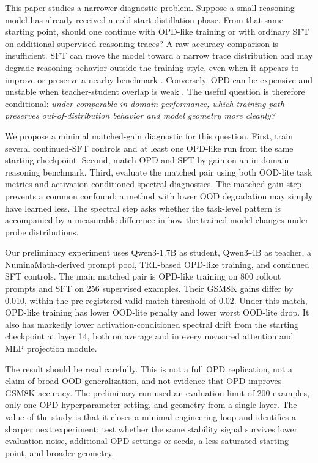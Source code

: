 \documentclass[letterpaper]{article}
\begin{document}
This paper studies a narrower diagnostic problem.
Suppose a small reasoning model has already received a cold-start distillation phase.
From that same starting point, should one continue with OPD-like training or with ordinary SFT on additional supervised reasoning traces?
A raw accuracy comparison is insufficient.
SFT can move the model toward a narrow trace distribution and may degrade reasoning behavior outside the training style, even when it appears to improve or preserve a nearby benchmark \citep{lobo2025finetuningcot}.
Conversely, OPD can be expensive and unstable when teacher-student overlap is weak \citep{li2026rethinkingopd}.
The useful question is therefore conditional: \emph{under comparable in-domain performance, which training path preserves out-of-distribution behavior and model geometry more cleanly?}

We propose a minimal matched-gain diagnostic for this question.
First, train several continued-SFT controls and at least one OPD-like run from the same starting checkpoint.
Second, match OPD and SFT by gain on an in-domain reasoning benchmark.
Third, evaluate the matched pair using both OOD-lite task metrics and activation-conditioned spectral diagnostics.
The matched-gain step prevents a common confound: a method with lower OOD degradation may simply have learned less.
The spectral step asks whether the task-level pattern is accompanied by a measurable difference in how the trained model changes under probe distributions.

Our preliminary experiment uses Qwen3-1.7B as student, Qwen3-4B as teacher, a NuminaMath-derived prompt pool, TRL-based OPD-like training, and continued SFT controls.
The main matched pair is OPD-like training on 800 rollout prompts and SFT on 256 supervised examples.
Their GSM8K gains differ by 0.010, within the pre-registered valid-match threshold of 0.02.
Under this match, OPD-like training has lower OOD-lite penalty and lower worst OOD-lite drop.
It also has markedly lower activation-conditioned spectral drift from the starting checkpoint at layer 14, both on average and in every measured attention and MLP projection module.

The result should be read carefully.
This is not a full OPD replication, not a claim of broad OOD generalization, and not evidence that OPD improves GSM8K accuracy.
The preliminary run used an evaluation limit of 200 examples, only one OPD hyperparameter setting, and geometry from a single layer.
The value of the study is that it closes a minimal engineering loop and identifies a sharper next experiment: test whether the same stability signal survives lower evaluation noise, additional OPD settings or seeds, a less saturated starting point, and broader geometry.
\end{document}
